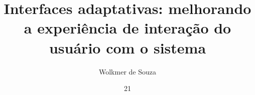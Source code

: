 \documentclass[tc]{unisc}
\title{Interfaces adaptativas: melhorando a experiência de interação do usuário com o sistema}
\author{Wolkmer de Souza}{Mateus}
\date{21}{novembro}{2019}
\begin{document}
\makecapa
\maketitle


\end{document}
